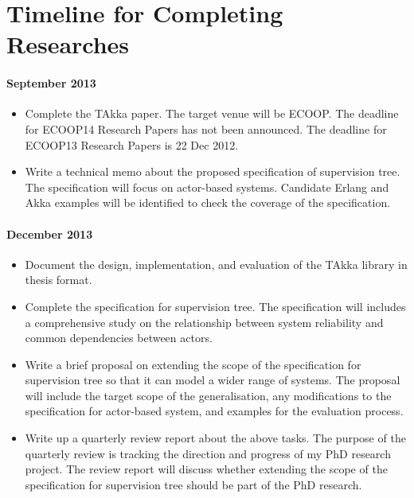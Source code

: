 \documentclass[11pt, a4paper, authoryear]{article}
\begin{document}
\newpage

\section{Timeline for Completing Researches}


\paragraph{September 2013}

\begin{itemize}
  \item Complete the TAkka paper.  The target venue will be ECOOP. The deadline 
for ECOOP14 Research Papers has not been announced. The deadline for ECOOP13 
Research Papers is 22 Dec 2012.
  \item Write a technical memo about the proposed specification of 
supervision tree.  The specification will focus on actor-based systems.  
Candidate Erlang and Akka examples will be identified to check the coverage of 
the specification.
\end{itemize}

\paragraph{December 2013}
\begin{itemize}
  \item Document the design, implementation, and evaluation of the TAkka 
library in thesis format.
  \item Complete the specification for supervision tree.  The specification 
will includes a comprehensive study on the relationship between system 
reliability and common dependencies between actors.
  \item Write a brief proposal on extending the scope of the specification for 
supervision tree so that it can model a wider range of systems.  The proposal 
will include the target scope of the generalisation, any modifications to the 
specification for actor-based system, and examples for the evaluation process.
  \item Write up a quarterly review report about the above tasks.  The purpose 
of the quarterly review is tracking the direction and progress of my PhD 
research project.  The review report will discuss whether extending the scope 
of the specification for supervision tree should be part of the PhD research.
\end{itemize}
\end{document}
